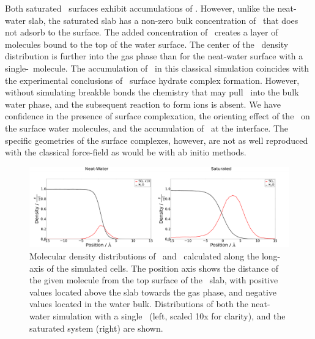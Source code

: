 Both saturated \suldiox~surfaces exhibit accumulations of \suldiox. However, unlike the neat-water slab, the saturated slab has a non-zero bulk concentration of \suldiox~that does not adsorb to the surface. The added concentration of \suldiox~creates a layer of molecules bound to the top of the water surface. The center of the \suldiox~density distribution is further into the gas phase than for the neat-water surface with a single-\suldiox~molecule. The accumulation of \suldiox~in this classical simulation coincides with the experimental conclusions of \suldiox~surface hydrate complex formation. However, without simulating breakble bonds the chemistry that may pull \suldiox~into the bulk water phase, and the subsequent reaction to form ions is absent. We have confidence in the presence of surface complexation, the orienting effect of the \suldiox~on the surface water molecules, and the accumulation of \suldiox~at the interface. The specific geometries of the surface complexes, however, are not as well reproduced with the classical force-field as would be with ab initio methods.\cite{Baer2010} %

\begin{figure}[h!]
	\begin{center}
		\includegraphics[scale=1.0]{images/density/density.png}
		\caption{Molecular density distributions of \wat~and \suldiox~calculated along the long-axis of the simulated cells. The position axis shows the distance of the given molecule from the top surface of the \wat~slab, with positive values located above the slab towards the gas phase, and negative values located in the water bulk. Distributions of both the neat-water simulation with a single \suldiox~(left, scaled 10x for clarity), and the saturated system (right) are shown.}
		\label{fig:density}
	\end{center}
\end{figure}
